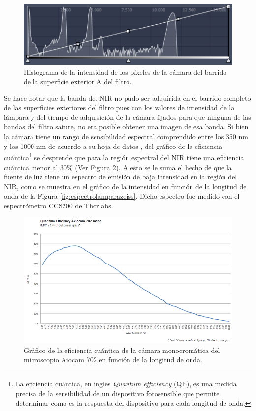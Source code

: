\begin{figure}[H]
	\centering
	\includegraphics[width=1.0\textwidth]{Figs/defectosZEISS/histograma15x15.png}
	\caption{Histograma de la intensidad de los píxeles de la cámara del barrido de la superficie exterior A del filtro.}
	\label{fig:histograma15x15}
\end{figure}

Se hace notar que la banda del NIR no pudo ser adquirida en el barrido completo de las superficies exteriores del filtro pues con los valores de intensidad de la lámpara y del tiempo de adquisición de la cámara fijados para que ninguna de las bandas del filtro sature, no era posible obtener una imagen de esa banda. Si bien la cámara tiene un rango de sensibilidad espectral comprendido entre los 350 nm y los 1000 nm de acuerdo a su hoja de datos \cite{Zeiss}, del gráfico de la eficiencia cuántica\footnote{La eficiencia cuántica, en inglés \textit{Quantum efficiency} (QE), es una medida precisa de la sensibilidad de un dispositivo fotosensible que permite determinar como es la respuesta del dispositivo para cada longitud de onda.} se desprende que para la región espectral del NIR tiene una eficiencia cuántica menor al 30\% (Ver Figura \ref{fig:eficienciacuanticamara}). A esto se le suma el hecho de que la fuente de luz tiene un espectro de emisión de baja intensidad en la región del NIR, como se muestra en el gráfico de la intensidad en función de la longitud de onda de la Figura \ref{fig:espectrolamparazeiss}. Dicho espectro fue medido con el espectrómetro CCS200 de Thorlabs. 


\begin{figure}[H]
	\centering
	\includegraphics[width=1.0\textwidth]{Figs/defectosZEISS/eficienciacuanticacamarazeiss.png}
	\caption{Gráfico de la eficiencia cuántica de la cámara monocromática del microscopio Aiocam 702 en función de la longitud de onda.}
	\label{fig:eficienciacuanticamara}
\end{figure}



